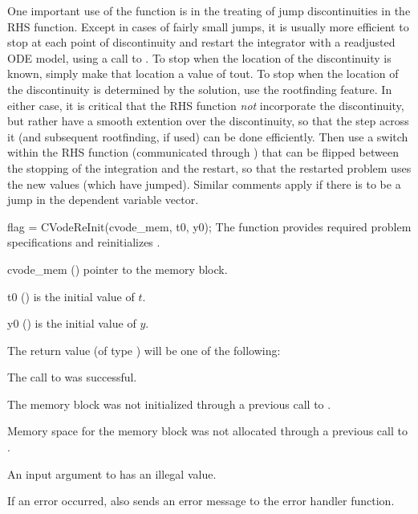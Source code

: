 One important use of the  function is in the treating
of jump discontinuities in the RHS function.  Except in cases of
fairly small jumps, it is usually more efficient to stop at each point
of discontinuity and restart the integrator with a readjusted ODE
model, using a call to .  To stop when the location of
the discontinuity is known, simply make that location a value of tout.
To stop when the location of the discontinuity is determined by the
solution, use the rootfinding feature.  In either case, it is critical
that the RHS function {\it not} incorporate the discontinuity, but
rather have a smooth extention over the discontinuity, so that the
step across it (and subsequent rootfinding, if used) can be done
efficiently.  Then use a switch within the RHS function (communicated
through ) that can be flipped between the stopping of
the integration and the restart, so that the restarted problem uses
the new values (which have jumped).  Similar comments apply if there
is to be a jump in the dependent variable vector.

{
  flag = CVodeReInit(cvode\_mem, t0, y0);
}
{
  The function  provides required problem specifications 
  and reinitializes {\cvodes}.
}
{
  \begin{args}
  \item[cvode\_mem] ()
    pointer to the {\cvodes} memory block.
  \item[t0] ()
    is the initial value of $t$.
  \item[y0] ()
    is the initial value of $y$. 
  \end{args}
}
{
  The return value  (of type ) will be one of the following:
  \begin{args}[CV\_NO\_MALLOC]
  \item[\Id{CV\_SUCCESS}]
    The call to  was successful.
  \item[\Id{CV\_MEM\_NULL}] 
    The {\cvodes} memory block was not initialized through a 
    previous call to .
  \item[\Id{CV\_NO\_MALLOC}] 
    Memory space for the {\cvodes} memory block was not allocated through a 
    previous call to .
  \item[\Id{CV\_ILL\_INPUT}] 
    An input argument to  has an illegal value.
  \end{args}
}
{
  If an error occurred,  also sends an error message to the
  error handler function.
}


